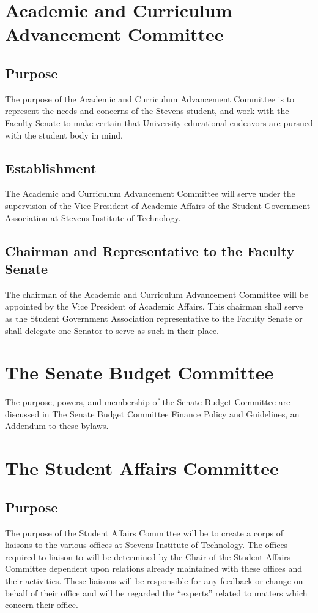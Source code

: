 \documentclass[12pt]{scrreprt}
\begin{document}
\section{Academic and Curriculum Advancement Committee}

\subsection{Purpose}
The purpose of the Academic and Curriculum Advancement Committee is to represent
the needs and concerns of the Stevens student, and work with the Faculty Senate to
make certain that University educational endeavors are pursued with the student body
in mind.

\subsection{Establishment}
The Academic and Curriculum Advancement Committee will serve under the supervision
of the Vice President of Academic Affairs of the Student Government Association at
Stevens Institute of Technology. 

\subsection{Chairman and Representative to the Faculty Senate}
The chairman of the Academic and Curriculum Advancement Committee will be
appointed by the Vice President of Academic Affairs. This chairman shall serve as the
Student Government Association representative to the Faculty Senate or shall delegate
one Senator to serve as such in their place.

\section{The Senate Budget Committee}
The purpose, powers, and membership of the Senate Budget Committee are discussed in The Senate Budget Committee Finance Policy and Guidelines, an Addendum to these bylaws.

\section{The Student Affairs Committee}

\subsection{Purpose}
The purpose of the Student Affairs Committee will be to create a corps of liaisons to the
various offices at Stevens Institute of Technology. The offices required to liaison to will be
determined by the Chair of the Student Affairs Committee dependent upon relations already
maintained with these offices and their activities. These liaisons will be responsible for any
feedback or change on behalf of their office and will be regarded the “experts” related to
matters which concern their office.
\end{document}
